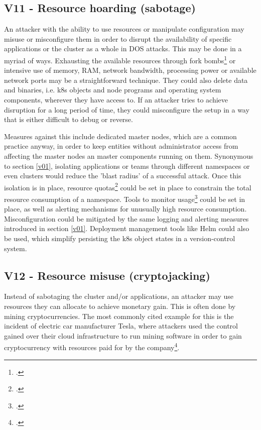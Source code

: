 \subsection{V11 - Resource hoarding (sabotage)} \label{v11}
An attacker with the ability to use resources or manipulate configuration may misuse or misconfigure them in order to disrupt the availability of specific applications or the cluster as a whole in DOS attacks.
This may be done in a myriad of ways. Exhausting the available resources through fork bombs\footcite[][, chapter 'Fork Bombs and Resource-Based Attacks']{k8sBook} or intensive use of memory, RAM, network bandwidth, processing power or available network ports may be a straightforward technique. They could also delete data and binaries, i.e. \gls{k8s} objects and node programs and operating system components, wherever they have access to.
If an attacker tries to achieve disruption for a long period of time, they could misconfigure the setup in a way that is either difficult to debug or reverse.

Measures against this include dedicated master nodes, which are a common practice anyway, in order to keep entities without administrator access from affecting the master nodes an master components running on them. Synonymous to section \ref{v01}, isolating applications or teams through different namespaces or even clusters would reduce the 'blast radius' of a successful attack. Once this isolation is in place, resource quotas\footcite[][, section 'Viewing and Setting Quotas']{resourceQuota} could be set in place to constrain the total resource consumption of a namespace. Tools to monitor usage\footcite[][, first paragraph]{k8sResourceMonitoring} could be set in place, as well as alerting mechanisms for unusually high resource consumption. Misconfiguration could be mitigated by the same logging and alerting measures introduced in section \ref{v01}. Deployment management tools like Helm could also be used, which simplify persisting the \gls{k8s} object states in a version-control system.

\subsection{V12 - Resource misuse (cryptojacking)}
Instead of sabotaging the cluster and/or applications, an attacker may use resources they can allocate to achieve monetary gain. This is often done by mining cryptocurrencies. The most commonly cited example for this is the incident of electric car manufacturer Tesla, where attackers used the control gained over their cloud infrastructure to run mining software in order to gain cryptocurrency with resources paid for by the company\footcite[][, section 'The Latest Victim: Tesla']{teslaIncident}.

